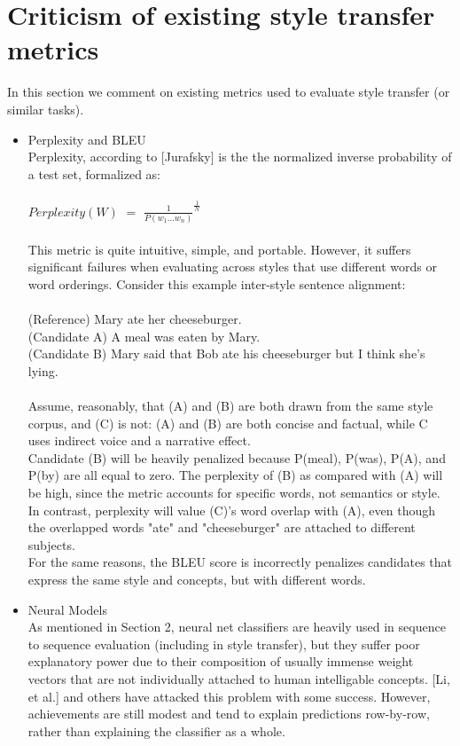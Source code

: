 \documentclass[letterpaper, 10 pt, conference]{ieeeconf}  %
\begin{document}
\section{Criticism of existing style transfer metrics}
In this section we comment on existing metrics used to evaluate style transfer (or similar tasks).
\begin{itemize}
  \item{ Perplexity and BLEU}
  \\
  Perplexity, according to [Jurafsky] is the the normalized inverse probability of a test set, formalized as:
  \\
  \\
  $Perplexity(W) $ $=$ $\frac{1}{P(w_1 \ldots w_n)}^{\frac{1}{N}}$
  \\
  \\
  This metric is quite intuitive, simple, and portable. However, it suffers significant failures when evaluating across styles that use different words or word orderings. Consider this example inter-style sentence alignment:\\
  \\
  (Reference) Mary ate her cheeseburger.\\
  (Candidate A) A meal was eaten by Mary.\\
  (Candidate B) Mary said that Bob ate his cheeseburger but I think she's lying.\\
  \\
  Assume, reasonably, that (A) and (B) are both drawn from the same style corpus, and (C) is not: (A) and (B) are both concise and factual, while C uses indirect voice and a narrative effect.
  \\
  Candidate (B) will be heavily penalized because P(meal), P(was), P(A), and P(by) are all equal to zero.  The perplexity of (B) as compared with (A) will be high, since the metric accounts for specific words, not semantics or style. In contrast, perplexity will value (C)'s word overlap with (A), even though the overlapped words "ate" and "cheeseburger" are attached to different subjects.
  \\
  For the same reasons, the BLEU score is incorrectly penalizes candidates that express the same style and concepts, but with different words. \\

  \item{Neural Models}\\ As mentioned in Section 2, neural net classifiers are heavily used in sequence to sequence evaluation (including in style transfer), but they suffer poor explanatory power due to their composition of usually immense weight vectors that are not individually attached to human intelligable concepts. [Li, et al.] and others have attacked this problem with some success. However, achievements are still modest and tend to explain predictions row-by-row, rather than explaining the classifier as a whole. \\


\end{itemize}
\end{document}
